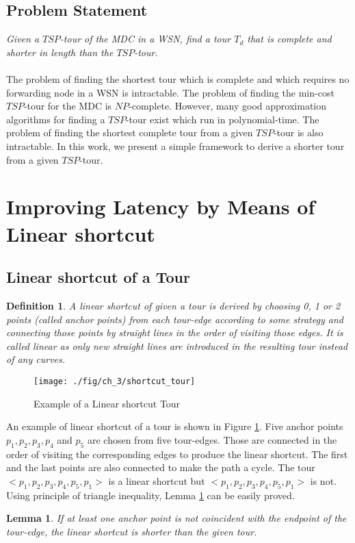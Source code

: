 \documentclass{llncs}
\newtheorem{mydef}{Definition}%
\newtheorem{mylemma}{Lemma}%
\begin{document}
\subsection*{Problem Statement}
\textit{
Given a $TSP$-tour of the MDC in a WSN, find a tour $T_d$ that is
\textit{complete} and \textit{shorter} in length than the $TSP$-tour}.
\\ \\
The problem of finding the shortest tour which is complete and which requires no forwarding node in
a WSN is intractable. The problem of finding the min-cost $TSP$-tour for the MDC is $NP$-complete.
However, many good approximation algorithms for finding a $TSP$-tour exist which run in
polynomial-time. The problem of finding the shortest complete tour from a given $TSP$-tour is also
intractable. In this work, we present a simple framework to derive a shorter tour from a given
$TSP$-tour.
\section{Improving Latency by Means of Linear shortcut}
\subsection{Linear shortcut of a Tour} 
\begin{mydef}
A linear shortcut of given a tour is derived by choosing 0, 1 or 2 points (called anchor points)
from each tour-edge according to some strategy and connecting 
those points by straight lines in the order of visiting those edges. 
It is called linear as only new straight lines are introduced in
the resulting tour instead of any curves.
\end{mydef}
\begin{figure}[h!]
  \centering
    \texttt{[image: ./fig/ch\_3/shortcut\_tour]} 
     \caption{Example of a Linear shortcut Tour}
     \label{fig:shortcut_tour_example}  
\end{figure} 
An example of linear shortcut of a tour is shown in Figure \ref{fig:shortcut_tour_example}.
Five anchor points $p_1, p_2, p_3, p_4$ and $p_5$ are chosen from five tour-edges. Those are
connected in the order of visiting the corresponding edges to produce the linear shortcut. The first
and the last points are also connected to make the path a cycle. The tour $<p_1, p_2, p_3,
p_4,p_5,p_1>$ is a linear shortcut but  $<p_1, p_2, p_3,p_4,p_5,p_1>$ is not.
Using principle of triangle
inequality, Lemma \ref{lemma_sc} can be easily proved.
\begin{mylemma}
	If at least one anchor point is not coincident with the endpoint of the tour-edge, the linear
	shortcut is shorter than the given tour.
	\label{lemma_sc}
\end{mylemma}
\end{document}
